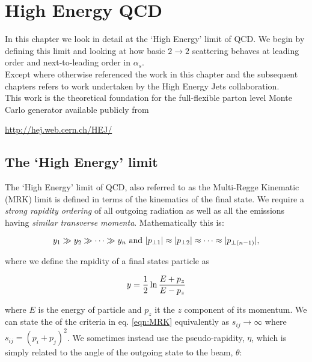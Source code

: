  \chapter{High Energy QCD}
\label{chap:HEQCD}

	In this chapter we look in detail at the `High Energy' limit of QCD.  We begin by defining this limit and
	looking at how basic $2\rightarrow2$ scattering behaves at leading order and next-to-leading order in
	$\alpha_s$.\\Except where otherwise referenced the work in this chapter and the subsequent chapters refers to
	work undertaken by the High Energy Jets collaboration.\\This work is the theoretical foundation for the
	full-flexible parton level Monte Carlo generator available publicly from

	\begin{center}
	\url{http://hej.web.cern.ch/HEJ/}
	\end{center}

	\section{The `High Energy' limit}
		\label{sub:HElimit}

		The `High Energy' limit of QCD, also referred to as the Multi-Regge Kinematic (MRK) limit is
		defined in terms of the kinematics of the final state.  We require a \emph{strong rapidity ordering}
		of all outgoing radiation as well as all the emissions having \emph{similar transverse momenta}.
		Mathematically this is:

		\begin{equation}
			y_1\gg y_2\gg\cdots\gg\\y_n \text{ and } |p_{\perp1}| \approx |p_{\perp2}| \approx\cdots\approx|p_{\perp(n-1)}|,
			\label{eqn:MRK}
		\end{equation}

  		where we define the rapidity of a final states particle as

		\begin{equation}
			y = \frac{1}{2}\ln\frac{E+p_z}{E-p_z}
			\label{eqn:rap}
		\end{equation}

		where $E$ is the energy of particle and $p_z$ it the $z$ component of its momentum. We can
		state the of the criteria in eq. \eqref{eqn:MRK} equivalently as $s_{ij}\rightarrow\infty$ where
		$s_{ij} = (p_i + p_j)^2$.  We sometimes instead use the pseudo-rapidity, $\eta$, which is
		simply related to the angle of the outgoing state to the beam, $\theta$:

